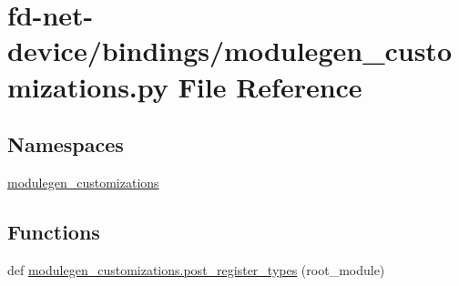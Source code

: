 \hypertarget{fd-net-device_2bindings_2modulegen__customizations_8py}{}\section{fd-\/net-\/device/bindings/modulegen\+\_\+customizations.py File Reference}
\label{fd-net-device_2bindings_2modulegen__customizations_8py}
\subsection*{Namespaces}
\begin{DoxyCompactItemize}
\item 
 \hyperlink{namespacemodulegen__customizations}{modulegen\+\_\+customizations}
\end{DoxyCompactItemize}
\subsection*{Functions}
\begin{DoxyCompactItemize}
\item 
def \hyperlink{namespacemodulegen__customizations_a752cb066e8de8ee88028481335101ec9}{modulegen\+\_\+customizations.\+post\+\_\+register\+\_\+types} (root\+\_\+module)
\end{DoxyCompactItemize}
